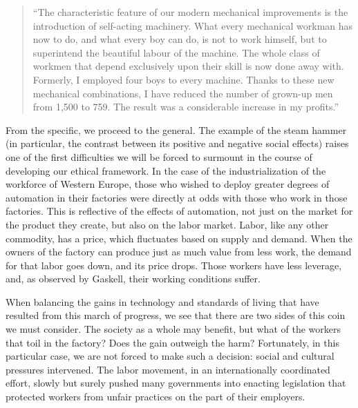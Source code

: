 \begin{quotation}\small
  ``The characteristic feature of our modern mechanical 
  improvements is the introduction of self-acting machinery. What every 
  mechanical workman has now to do, and what every boy can do, is not to 
  work himself, but to superintend the beautiful labour of the machine. 
  The whole class of workmen that depend exclusively upon their skill is 
  now done away with. Formerly, I employed four boys to every machine. 
  Thanks to these new mechanical combinations, I have reduced the number 
  of grown-up men from 1,500 to 759. The result was a considerable 
  increase in my profits.''\cite{marx1867strife}
\end{quotation}

From the specific, we proceed to the general.  The example of the steam 
hammer (in particular, the contrast between its positive and negative 
social effects) raises one of the first difficulties we will be forced to 
surmount in the course of developing our ethical framework.  
In the case of the industrialization of the workforce of Western 
Europe, those who wished to deploy greater 
degrees of automation in their factories were directly at odds 
with those who work in those factories.  This is reflective of 
the effects of automation, not just on the market for the product they 
create, but also on the labor market.  Labor, like any other commodity, 
has a price, which fluctuates based on supply and demand.  When the 
owners of the factory can produce just as much value from less work, 
the demand for that labor goes down, and its price drops.  Those 
workers have less leverage, and, as observed by Gaskell, their working 
conditions suffer.

When balancing the gains in technology and standards of living that 
have resulted from this march of progress, we see that there are two 
sides of this coin we must consider.  The society as a whole may 
benefit, but what of the workers that toil in the factory?  Does the 
gain outweigh the harm?  Fortunately, in this particular case, we are not 
forced to make such a decision: social and cultural pressures intervened.  
The labor movement, in an internationally 
coordinated effort, slowly but surely pushed many governments 
into enacting legislation that protected workers from unfair practices 
on the part of their employers.

